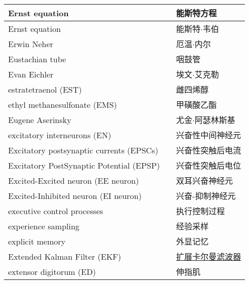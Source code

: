 \begin{longtable}{lll}
	\midrule
	Ernst equation    &&  能斯特方程  \\
	
	\midrule
	Ernst equation    &&  能斯特$\cdot$韦伯  \\
	
	\midrule
	Erwin Neher    &&  厄温$\cdot$内尔  \\
	
	\midrule
	Eustachian tube    &&  咽鼓管  \\
	
	\midrule
	Evan Eichler    &&  埃文$\cdot$艾克勒  \\
	
	\midrule
	estratetraenol (EST)   &&  雌四烯醇  \\
	
	\midrule
	ethyl methanesulfonate (EMS)    &&  甲磺酸乙酯  \\
	
	\midrule
	Eugene Aserinsky    &&  尤金$\cdot$阿瑟林斯基  \\
	
	\midrule
	excitatory interneurons  (EN)  &&  兴奋性中间神经元  \\
	
	\midrule
	Excitatory postsynaptic currents (EPSCs)     &&  兴奋性突触后电流  \\
	
	\midrule
	Excitatory PostSynaptic Potential (EPSP)     &&  兴奋性突触后电位  \\
	
	\midrule
	Excited-Excited neuron (EE neuron)     &&  双耳兴奋神经元  \\
	
	\midrule
	Excited-Inhibited neuron (EI neuron)     && 兴奋-抑制神经元   \\
	
	\midrule
	executive control processes     && 执行控制过程   \\
	
	\midrule
	experience sampling     && 经验采样   \\
	
	\midrule
	explicit memory     && 外显记忆   \\
	
	\midrule
	Extended Kalman Filter (EKF)     && \href{https://baike.baidu.com/item/EKF/9375021?fr=ge_ala}{扩展卡尔曼滤波器}   \\
	
	\midrule
	extensor digitorum (ED)     && 伸指肌   \\
	

\end{longtable}
